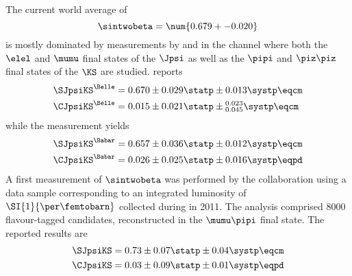 The current world average of
%
\begin{equation}
  \sintwobeta = \num{0.679 +- 0.020}
\end{equation}
%
is mostly dominated by measurements by \Babar and \Belle in the \BdToJpsiKS
channel where both the $\elel$ and $\mumu$ final states of the $\Jpsi$ as well
as the $\pipi$ and $\piz\piz$ final states of the $\KS$ are studied. \Belle
\cite{Adachi:2012et} reports
%
\begin{equation*}
  \begin{split}
    \SJpsiKS^{\Belle} &= 0.670 \pm 0.029 \statp \pm 0.013 \systp \eqcm \\
    \CJpsiKS^{\Belle} &= 0.015 \pm 0.021 \statp \pm {}_{0.045}^{0.023} \systp \eqcm
  \end{split}
\end{equation*}
%
while the \Babar measurement \cite{Aubert:2009aw} yields
%
\begin{equation*}
  \begin{split}
    \SJpsiKS^{\Babar} &= 0.657 \pm 0.036 \statp \pm 0.012 \systp \eqcm \\
    \CJpsiKS^{\Babar} &= 0.026 \pm 0.025 \statp \pm 0.016 \systp \eqpd
  \end{split}
\end{equation*}
%
A first measurement of $\sintwobeta$ was performed by the \LHCb collaboration
using a data sample corresponding to an integrated luminosity of
$\SI{1}{\per\femtobarn}$ collected during \RunOne in 2011. The analysis
comprised $\num{8000}$ flavour-tagged \BdToJpsiKS candidates, reconstructed in
the $\mumu\pipi$ final state. The reported results are
%
\begin{equation*}
  \begin{split}
    \SJpsiKS &= 0.73 \pm 0.07 \statp \pm 0.04 \systp \eqcm \\
    \CJpsiKS &= 0.03 \pm 0.09 \statp \pm 0.01 \systp \eqpd
  \end{split}
\end{equation*}
%
















